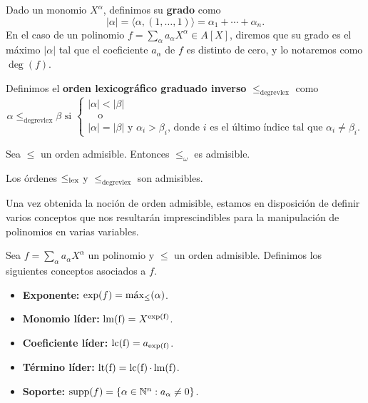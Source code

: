 \begin{definicion}
    Dado un monomio $X^{\alpha}$, definimos su \textbf{grado} como 
    $$\vert \alpha\vert = \langle \alpha, (1,\dots, 1)\rangle = \alpha_1+\cdots + \alpha_n.$$
    En el caso de un polinomio $f = \sum_{\alpha} a_{\alpha} X^{\alpha}\in A[X]$, diremos que su grado es el máximo $\vert \alpha \vert$ tal que el coeficiente $a_{\alpha}$ de $f$ es distinto de cero, y lo notaremos como $\deg(f)$.
\end{definicion}

\begin{definicion}
    Definimos el \textbf{orden lexicográfico graduado inverso} $\le_{\text{degrevlex}}$ como
    \begin{equation*}
        \alpha \le_{\text{degrevlex}} \beta \text{ si } \begin{cases}
            |\alpha| < |\beta| \\
            \quad\text{o}   \\
            |\alpha| = |\beta| \text{ y } \alpha_i > \beta_i \text{, donde $i$ es el último índice tal que } \alpha_i \neq \beta_i.
        \end{cases}
    \end{equation*}
\end{definicion}

\begin{proposicion}
    Sea $\le$ un orden admisible. Entonces $\le_{\omega}$ es admisible.
\end{proposicion}
\begin{proposicion}
    Los órdenes $\lex$ y $\le_{\text{degrevlex}}$ son admisibles.
\end{proposicion}

Una vez obtenida la noción de orden admisible, estamos en disposición de definir varios conceptos que nos resultarán imprescindibles para la manipulación de polinomios en varias variables.

\begin{definicion}
    Sea $f= \sum_{\alpha} a_{\alpha} X^{\alpha}$ un polinomio y $\le$ un orden admisible. Definimos los siguientes conceptos asociados a $f$.
    \begin{itemize}
        \item \textbf{Exponente:} $\exp(f) = \Max_{\le}(\alpha)$.
        \item \textbf{Monomio líder:}  $\lmf = X^{\expf}$.
        \item \textbf{Coeficiente líder:} $\lcf = a_{\expf}$.
        \item \textbf{Término líder:} $\ltf = \lcf \cdot \lmf$.
        \item \textbf{Soporte:} $\supp(f) =  \{ \alpha\in \Nn : a_{\alpha} \neq 0\}$.
    \end{itemize}
\end{definicion}

